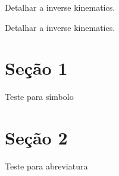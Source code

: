 \begin{guide}
	Detalhar a inverse kinematics.
\end{guide}

\begin{guide}
	Detalhar a inverse kinematics.
\end{guide}

\section{Seção 1}
\label{sec:Orientacao}

Teste para símbolo



\section{Seção 2}

Teste para abreviatura 


